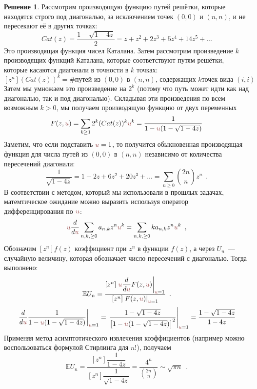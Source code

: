 \documentclass[a5paper]{article}
\theoremstyle{definition}
\newtheorem*{solution}{Решение}
\begin{document}
\begin{solution}
Рассмотрим производящую функцию путей решётки, которые находятся строго под
диагональю, за исключением точек \( (0,0) \) и \( (n,n) \), и не пересекают её в
других точках:
$$
    Cat(z) = \dfrac{1 - \sqrt{1 - 4z}}{2} = z + z^2 + 2z^3 + 5z^4 + 14z^5 + \ldots
$$
Это производящая функция чисел Каталана. Затем рассмотрим произведение \( k \)
производящих функций Каталана, которые соответствуют путям решётки, которые
касаются диагонали в точности в \( k \) точках:
$$
    [z^n] (Cat(z))^k = \text{\# путей из $(0,0)$ в $(n,n)$, содержащих $k$
точек вида $(i,i)$}
$$
Затем мы умножаем это произведение на \( 2^k \) (потому что путь может идти как
над диагональю, так и под диагональю). Складывая эти произведения по всем
возможным \( k > 0 \), мы получаем производящую функцию от двух переменных
$$
    F(z,\uu) = \sum_{k \geq 1} 2^k(Cat(z))^k \uu^k = \dfrac{1}{1 - \uu(1 - \sqrt{1-4z})}
$$
Заметим, что если подставить \( \uu = 1 \), то получится обыкновенная производящая
функция для числа путей из \( (0,0) \) в \( (n,n) \) независимо от количества
пересечений диагонали:
$$
    \dfrac{1}{\sqrt{1-4z}} = 1 + 2z + 6z^2 + 20z^3 + \ldots = \sum_{n \geq 0} {2n \choose n} z^n \enspace .
$$
В соответствии с методом, который мы использовали в прошлых задачах,
матемтическое ожидание можно выразить используя оператор дифференцирования по \(
\uu \):
$$
    \uu \dfrac{d}{d\uu} \sum_{n, k, \geq 0} a_{n,k} z^n \uu^k = 
    \sum_{n, k, \geq 0} k a_{n,k} z^n \uu^k \enspace ,
$$
Обозначим  $[z^n]f(z)$ коэффициент при $z^n$ в функции $f(z)$, а через $U_n$~---
случайную величину, которая обозначает число пересечений с диагональю. Тогда
выполнено:
$$
    \mathbb E U_n = \dfrac{[z^n] \left.\uu \dfrac{d}{d\uu}
F(z,\uu)\right|_{\uu=1}}{[z^n] \left.F(z,\uu)\right|_{\uu=1}} \enspace .
$$
$$
    \left.\dfrac{d}{d\uu}\dfrac{1}{1 - \uu(1 - \sqrt{1-4z})} \right|_{\uu=1} = 
    \left.\dfrac{1 - \sqrt{1-4z}}{\left[1 - \uu(1 - \sqrt{1-4z})\right]^2}
\right|_{\uu=1} =
    \dfrac{1 - \sqrt{1-4z}}{1 - 4z}
$$
Применяя метод асимптотического извлечения коэффициентов (например можно
воспользоваться формулой Стирлинга для \( n! \)), получаем
$$
    \mathbb E U_n =
    \dfrac{[z^n] \dfrac{1}{1 - 4z}}
    {[z^n] \dfrac{1}{\sqrt{1 - 4z}}} = 
    \dfrac{4^n}{ {2n \choose n} } \sim \sqrt{ \pi n}
    \enspace .
$$
\end{solution}
    
\end{document}
